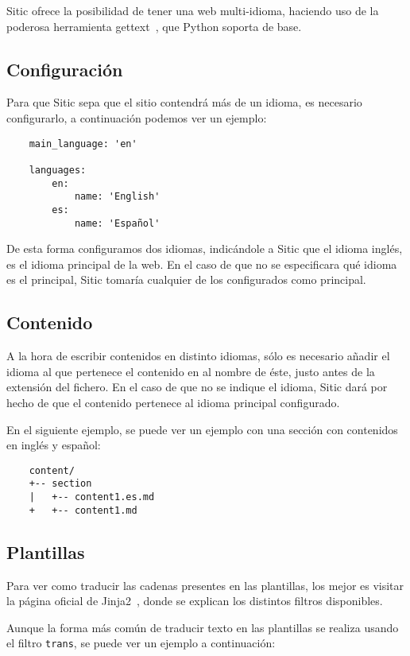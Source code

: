 Sitic ofrece la posibilidad de tener una web multi-idioma, haciendo uso de la poderosa herramienta
gettext~\cite{gettext}, que Python soporta de base.

\subsection{Configuración}

Para que Sitic sepa que el sitio contendrá más de un idioma, es necesario configurarlo, a continuación
podemos ver un ejemplo:

\begin{verbatim}
    main_language: 'en'

    languages:
        en:
            name: 'English'
        es:
            name: 'Español'
\end{verbatim}

De esta forma configuramos dos idiomas, indicándole a Sitic que el idioma inglés, es el idioma principal
de la web. En el caso de que no se especificara qué idioma es el principal, Sitic tomaría cualquier de
los configurados como principal.

\subsection{Contenido}

A la hora de escribir contenidos en distinto idiomas, sólo es necesario añadir el idioma al que pertenece el
contenido en al nombre de éste, justo antes de la extensión del fichero. En el caso de que no se indique el
idioma, Sitic dará por hecho de que el contenido pertenece al idioma principal configurado.

En el siguiente ejemplo, se puede ver un ejemplo con una sección con contenidos en inglés y español:

\begin{verbatim}
    content/
    +-- section
    |   +-- content1.es.md
    +   +-- content1.md
\end{verbatim}

\subsection{Plantillas}

Para ver como traducir las cadenas presentes en las plantillas, los mejor es visitar la página oficial de
Jinja2~\cite{jinja}, donde se explican los distintos filtros disponibles.

Aunque la forma más común de traducir texto en las plantillas se realiza usando el filtro \texttt{trans}, se puede
ver un ejemplo a continuación:

